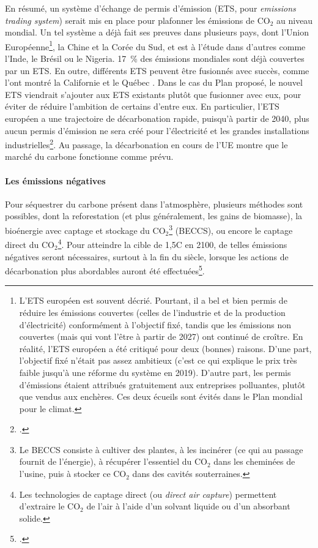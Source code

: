 \documentclass[a5paper,french,openany]{memoir}
\begin{document}
En résumé, un système d'échange de permis d'émission (ETS, pour \textit{emissions trading system}) serait mis en place pour plafonner les émissions de CO$_\text{2}$ au niveau mondial. 
Un tel système a déjà fait ses preuves dans plusieurs pays, dont l'Union Européenne\footnote{L'ETS européen est souvent décrié. Pourtant, il a bel et bien permis de réduire les émissions couvertes (celles de l'industrie et de la production d'électricité) conformément à l'objectif fixé, tandis que les émissions non couvertes (mais qui vont l'être à partir de 2027) ont continué de croître. En réalité, l'ETS européen a été critiqué pour deux (bonnes) raisons. D'une part, l'objectif fixé n'était pas assez ambitieux (c'est ce qui explique le prix très faible jusqu'à une réforme du système en 2019). D'autre part, les permis d'émissions étaient attribués gratuitement aux entreprises polluantes, plutôt que vendus aux enchères. Ces deux écueils sont évités dans le Plan mondial pour le climat.}, la Chine et la Corée du Sud, et est à l'étude dans d'autres comme l'Inde, le Brésil ou le Nigeria. 17~\% des émissions mondiales sont déjà couvertes par un ETS. En outre, différents ETS peuvent être fusionnés avec succès, comme l'ont montré la Californie et le Québec \citep{icap_emissions_2023}. Dans le cas du Plan proposé, le nouvel ETS viendrait s'ajouter aux ETS existants plutôt que fusionner avec eux, pour éviter de réduire l'ambition de certains d'entre eux. En particulier, l'ETS européen a une trajectoire de décarbonation rapide, puisqu'à partir de 2040, plus aucun permis d'émission ne sera créé pour l'électricité et les grandes installations industrielles\footnote{\cite{pahle_emerging_2023}.}. Au passage, la décarbonation en cours de l'UE montre que le marché du carbone fonctionne comme prévu.

\paragraph{Les émissions négatives}
Pour séquestrer du carbone présent dans l'atmosphère, plusieurs méthodes sont possibles, dont la reforestation (et plus généralement, les gains de biomasse), la bioénergie avec captage et stockage du CO$_\text{2}$\footnote{Le BECCS consiste à cultiver des plantes, à les incinérer (ce qui au passage fournit de l'énergie), à récupérer l'essentiel du CO$_\text{2}$ dans les cheminées de l'usine, puis à stocker ce CO$_\text{2}$ dans des cavités souterraines.} (BECCS), ou encore le captage direct du CO$_\text{2}$\footnote{Les technologies de captage direct (ou \textit{direct air capture}) permettent d'extraire le CO$_\text{2}$ de l'air à l'aide d'un solvant liquide ou d'un absorbant solide.}. Pour atteindre la cible de 1,5\textdegree{}C en 2100, de telles émissions négatives seront nécessaires, surtout à la fin du siècle, lorsque les actions de décarbonation plus abordables auront été effectuées\footnote{\cite{minx_negative_2018}.}. 
\end{document}
